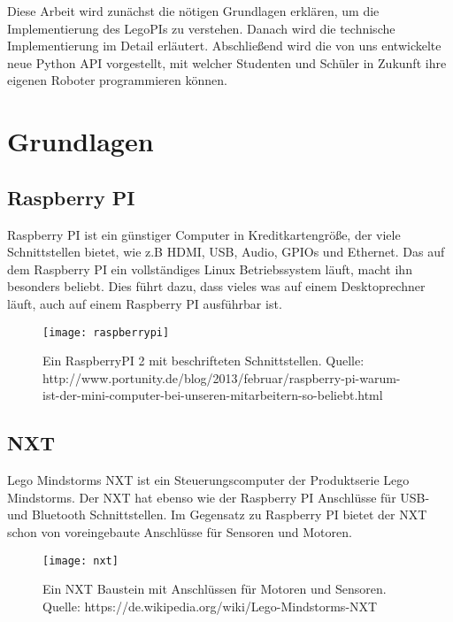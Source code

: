 Diese Arbeit wird zunächst die nötigen Grundlagen erklären, um die Implementierung des LegoPIs zu verstehen. Danach wird die technische Implementierung im Detail erläutert. Abschließend wird die von uns entwickelte neue Python API vorgestellt, mit welcher Studenten und Schüler in Zukunft ihre eigenen Roboter programmieren können.

\chapter{Grundlagen}
\section{Raspberry PI}
\label{Grundlagen:RaspberryPI}

Raspberry PI ist ein günstiger Computer in Kreditkartengröße, der viele Schnittstellen bietet, wie z.B HDMI, USB, Audio, GPIOs und Ethernet.
Das auf dem Raspberry PI ein vollständiges Linux Betriebssystem läuft, macht ihn besonders beliebt. Dies führt dazu, dass vieles was auf einem Desktoprechner läuft, auch auf einem Raspberry PI ausführbar ist.

\begin{figure}[h]
  \centering
  \texttt{[image: raspberrypi]}
  \caption{Ein RaspberryPI 2 mit beschrifteten Schnittstellen. Quelle: http://www.portunity.de/blog/2013/februar/raspberry-pi-warum-ist-der-mini-computer-bei-unseren-mitarbeitern-so-beliebt.html}
  \label{Kap1:RaspberryPI}
\end{figure}

\section{NXT}
\label{Grundlagen:NXT}

Lego Mindstorms NXT ist ein Steuerungscomputer der Produktserie Lego Mindstorms. Der NXT hat ebenso wie der Raspberry PI Anschlüsse für USB- und Bluetooth Schnittstellen. Im Gegensatz zu Raspberry PI bietet der NXT schon von voreingebaute Anschlüsse für Sensoren und Motoren. 

\begin{figure}[h]
  \centering
  \texttt{[image: nxt]}
  \caption{Ein NXT Baustein mit Anschlüssen für Motoren und Sensoren. Quelle: https://de.wikipedia.org/wiki/Lego-Mindstorms-NXT}
  \label{Kap1:NXT}
\end{figure}

